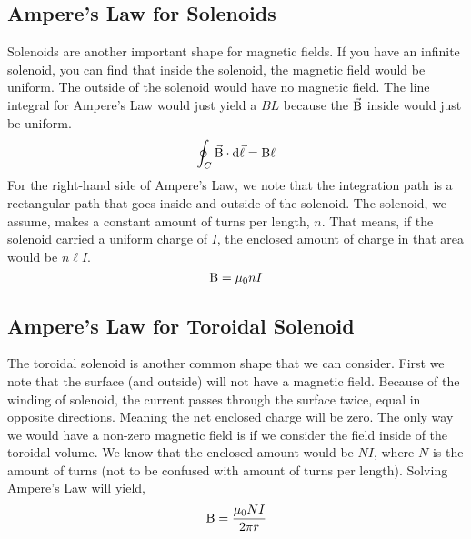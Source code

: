 \subsection{Ampere's Law for Solenoids}
Solenoids are another important shape for magnetic fields. If you have an infinite solenoid, you can find that inside the solenoid, the magnetic field would be uniform. The outside of the solenoid would have no magnetic field. The line integral for Ampere's Law would just yield a $BL$ because the $\vec{\mathrm{B}}$ inside would just be uniform.
\begin{equation*}
	\oint_C \vec{\mathrm{B}} \cdot \mathrm{d}\vec{\mathrm{\ell}} = \mathrm{B}\ell
\end{equation*}
For the right-hand side of Ampere's Law, we note that the integration path is a rectangular path that goes inside and outside of the solenoid. The solenoid, we assume, makes a constant amount of turns per length, $n$. That means, if the solenoid carried a uniform charge of $I$, the enclosed amount of charge in that area would be $n\ell I$.
\begin{equation*}
 \mathrm{B} = \mu_0nI 
\end{equation*}
\subsection{Ampere's Law for Toroidal Solenoid}
The toroidal solenoid is another common shape that we can consider. First we note that the surface (and outside) will not have a magnetic field. Because of the winding of solenoid, the current passes through the surface twice, equal in opposite directions. Meaning the net enclosed charge will be zero. The only way we would have a non-zero magnetic field is if we consider the field inside of the toroidal volume. We know that the enclosed amount would be $NI$, where $N$ is the amount of turns (not to be confused with amount of turns per length).
Solving Ampere's Law will yield,
\begin{equation*}
	\mathrm{B} = \frac{\mu_0NI}{2\pi r}
\end{equation*} 



\pagebreak
